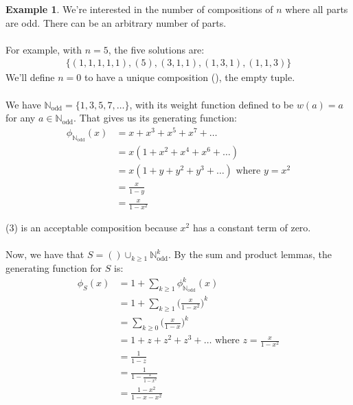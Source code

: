 \documentclass[]{article}
\theoremstyle{definition}
\newtheorem{ex}{Example}[section]
\begin{document}
				\begin{ex}
					We're interested in the number of compositions of $n$ where all parts are odd. There can be an arbitrary number of parts.
					\\ \\
					For example, with $n = 5$, the five solutions are:
					\begin{align*}
						\{ (1, 1, 1, 1, 1), (5), (3, 1, 1), (1, 3, 1), (1, 1, 3) \}
					\end{align*}
					We'll define $n = 0$ to have a unique composition (), the empty tuple.
					\\ \\
					We have $\mathbb{N}_{\text{odd}} = \{1, 3, 5, 7, \ldots\}$, with its weight function defined to be $w(a) = a$ for any $a \in \mathbb{N}_{\text{odd}}$. That gives us its generating function:
					\setcounter{equation}{0}
					\begin{align}
						\phi_{\mathbb{N}_{\text{odd}}}(x) &= x + x^3 + x^5 + x^7 + \ldots \\
						&= x(1 + x^2 + x^4 + x^6 + \ldots) \\
						&= x(1 + y + y^2 + y^3 + \ldots) \text{ where } y = x^2 \\
						&= \frac{x}{1 - y} \\
						&= \frac{x}{1 - x^2}
					\end{align}

					(3) is an acceptable composition because $x^2$ has a constant term of zero.
					\\ \\
					Now, we have that $S = () \cup_{k \ge 1} \mathbb{N}_{\text{odd}}^k$. By the sum and product lemmas, the generating function for $S$ is:
					\setcounter{equation}{0}
					\begin{align}
						\phi_S(x) &= 1 + \sum_{k \ge 1} \phi_{\mathbb{N}_{\text{odd}}}^k(x) \\
						&= 1 + \sum_{k \ge 1} \bigg( \frac{x}{1 - x^2} \bigg)^k \\
						&= \sum_{k \ge 0} \bigg( \frac{x}{1 - x} \bigg)^k \\
						&= 1 + z + z^2 + z^3 + \ldots \text{ where } z = \frac{x}{1 - x^2} \\
						&= \frac{1}{1 - z} \\
						&= \frac{1}{1 - \frac{x}{1 - x^2}} \\
						&= \frac{1 - x^2}{1 - x - x^2}
					\end{align}


\end{ex}
\end{document}

